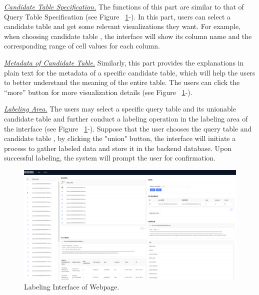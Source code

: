 \noindent \underline{\textit{Candidate Table Specification.}} The functions of this part are similar to that of Query Table Specification (see Figure ~\ref{fig:interface}-). In this part, users can select a candidate table and get some relevant visualizations they want. For example, when choosing candidate table , the interface will show its column name and the corresponding range of cell values for each column.

\noindent \underline{\textit{Metadata of Candidate Table.}}  Similarly, this part provides the explanations in plain text for the metadata of a specific candidate table, which will help the users to better understand the meaning of the entire table.  The users can click the “more” button for more visualization details (see Figure ~\ref{fig:interface}-).

\noindent \underline{\textit{Labeling Area.}} The users may select a specific query table and its unionable candidate table and further conduct a labeling operation in the labeling area of the interface (see Figure ~\ref{fig:interface}-). Suppose that the user chooses the query table  and candidate table , by clicking the "union" button, the interface will initiate a process to gather labeled data and store it in the backend database. Upon successful labeling, the system will prompt the user for confirmation.


\begin{figure}[h]
	\centering
	\includegraphics[width=1.0\linewidth]{fig/interface.png}
	\caption{Labeling Interface of Webpage.}
	\label{fig:interface}
\end{figure}

